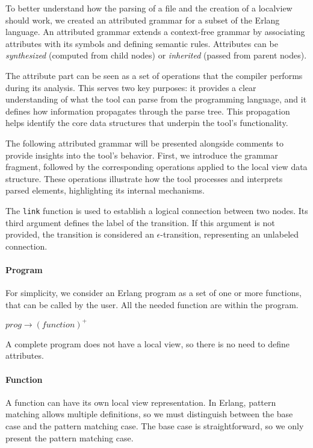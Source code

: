 To better understand how the parsing of a file and the creation of a localview 
should work, we created an attributed grammar for a subset of the Erlang 
language. An attributed grammar extends a context-free grammar by associating 
attributes with its symbols and defining semantic rules. Attributes can be 
\textit{synthesized} (computed from child nodes) or \textit{inherited}
(passed from parent nodes). 

The attribute part can be seen as a set of operations that the compiler  
performs during its analysis. This serves two key purposes: it provides  
a clear understanding of what the tool can parse from the programming  
language, and it defines how information propagates through the parse  
tree. This propagation helps identify the core data structures that  
underpin the tool’s functionality.  

The following attributed grammar will be presented alongside comments  
to provide insights into the tool’s behavior. First, we introduce the  
grammar fragment, followed by the corresponding operations applied  
to the local view data structure. These operations illustrate how the  
tool processes and interprets parsed elements, highlighting its  
internal mechanisms. 

The \texttt{link} function is used to establish a logical connection  
between two nodes. Its third argument defines the label of the transition.  
If this argument is not provided, the transition is considered an  
$\epsilon$-transition, representing an unlabeled connection. 

\paragraph{Program} For simplicity, we consider an Erlang program as a set 
of one or more functions, that can be called by the user. All the needed 
function are within the program.

\bigskip

\noindent $prog \to (function)^+$

\bigskip

A complete program does not have a local view, so there is no need  
to define attributes.  

\paragraph{Function}  
A function can have its own local view representation.  
In Erlang, pattern matching allows multiple definitions,  
so we must distinguish between the base case and the  
pattern matching case. The base case is straightforward,  
so we only present the pattern matching case.  

